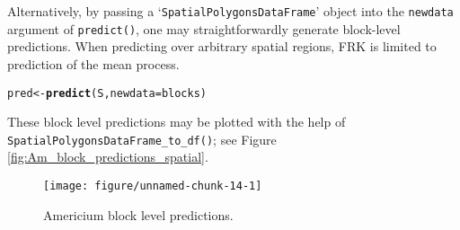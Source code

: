\documentclass{article}\usepackage[]{graphicx}\usepackage[]{color}
\makeatletter
\def\maxwidth{ %
  \ifdim\Gin@nat@width>\linewidth
    \linewidth
  \else
    \Gin@nat@width
  \fi
}
\newcommand{\hlstd}[1]{\textcolor[rgb]{0.345,0.345,0.345}{#1}}%
\newcommand{\hlkwb}[1]{\textcolor[rgb]{0.69,0.353,0.396}{#1}}%
\newcommand{\hlkwc}[1]{\textcolor[rgb]{0.333,0.667,0.333}{#1}}%
\newcommand{\hlkwd}[1]{\textcolor[rgb]{0.737,0.353,0.396}{\textbf{#1}}}%
\newenvironment{kframe}{%
 \def\at@end@of@kframe{}%
 \ifinner\ifhmode%
  \def\at@end@of@kframe{\end{minipage}}%
  \begin{minipage}{\columnwidth}%
 \fi\fi%
 \def\FrameCommand##1{\hskip\@totalleftmargin \hskip-\fboxsep
 \colorbox{shadecolor}{##1}\hskip-\fboxsep
     \hskip-\linewidth \hskip-\@totalleftmargin \hskip\columnwidth}%
 \MakeFramed {\advance\hsize-\width
   \@totalleftmargin\z@ \linewidth\hsize
   \@setminipage}}%
 {\par\unskip\endMakeFramed%
 \at@end@of@kframe}
\newenvironment{knitrout}{}{} %
\let\code=\texttt
\newcommand{\pkg}[1]{{\fontseries{b}\selectfont #1}}
\newcommand{\class}[1]{`\code{#1}'}
\newcommand{\fct}[1]{\code{#1()}}
\makeatother
\begin{document}
Alternatively, by passing a \class{SpatialPolygonsDataFrame} object into the \code{newdata} argument of \fct{predict}, one may straightforwardly generate block-level predictions. When predicting over arbitrary spatial regions, \pkg{FRK} is limited to prediction of the mean process. 

\begin{knitrout}
\color{fgcolor}\begin{kframe}
\begin{alltt}
\hlstd{pred} \hlkwb{<-} \hlkwd{predict}\hlstd{(S,} \hlkwc{newdata} \hlstd{= blocks)}
\end{alltt}
\end{kframe}
\end{knitrout}

 These block level predictions may be plotted with the help of \fct{SpatialPolygonsDataFrame\_to\_df}; see Figure \ref{fig:Am_block_predictions_spatial}. 

% 
%

\begin{knitrout}
\color{fgcolor}\begin{figure}

{\centering \texttt{[image: figure/unnamed-chunk-14-1]} 

}

\caption{Americium block level predictions.\label{fig:Am_block_predictions_spatial}}\label{fig:unnamed-chunk-14}
\end{figure}


\end{knitrout}


\end{document}
